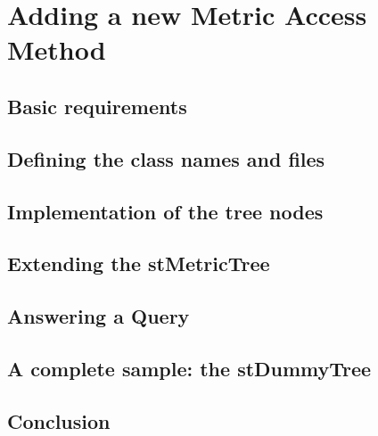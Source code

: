 \chapter{Adding a new Metric Access Method}
\label{cha:newstruct}

\section{Basic requirements}

\section{Defining the class names and files}

\section{Implementation of the tree nodes}

\section{Extending the stMetricTree}

\section{Answering a Query}

\section{A complete sample: the stDummyTree}

\section{Conclusion}